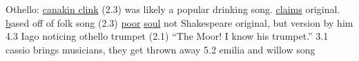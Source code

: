 \documentclass[12pt]{article}[titlepage]
\newcommand{\say}[1]{``#1''}
\newcommand{\1}{\={a}}
\newcommand{\2}{\={e}}
\newcommand{\3}{\={\i}}
\newcommand{\4}{\=o}
\newcommand{\5}{\=u}
\newcommand{\6}{\={A}}
\renewcommand{\,}{\textsuperscript{,}}
\begin{document}
Othello:
\href{https://www.shakespeare.org.uk/explore-shakespeare/blogs/shakespeares-drinking-songs/}{canakin clink} (2.3) was likely a popular drinking song. \href{http://www.lieder.net/lieder/get_text.html?TextId=18061}{claims} original.
\href{http://www.lieder.net/lieder/get_text.html?TextId=31027} based off of folk song (2.3)
\href{http://www.lieder.net/lieder/get_text.html?TextId=14898}{poor} \href{https://www.shakespeare.org.uk/explore-shakespeare/blogs/shakespeares-saddest-song/}{soul} not Shakespeare original, but version by him 4.3
Iago noticing othello trumpet (2.1) \say{The Moor! I know his trumpet.}
3.1 cassio brings musicians, they get thrown away
5.2 emilia and willow song
\end{document}
